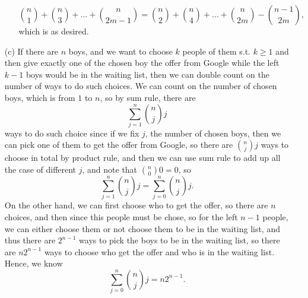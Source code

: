 \documentclass[a4paper,12pt]{article}
\begin{document}
\begin{itemize}
\begin{itemize}
		\[
			\binom{n}{1} + \binom{n}{3} + \dots + \binom{n}{2m - 1} = \binom{n}{2} + \binom{n}{4} + \dots + \binom{n}{2m} - \binom{n - 1}{2m},
		\] which is as desired.
	\end{itemize}
	\item[(c)] If there are \(n\) boys, and we want to choose \(k\) people of them s.t. \(k \ge 1\)  and then give exactly one of the chosen boy the offer from Google while the left \(k - 1\) boys would be in the waiting list, then we can double count on the number of ways to do such choices. We can count on the number of chosen boys, which is from \(1\) to \(n\), so by sum rule, there are 
	\[
		\sum_{j=1}^n \binom{n}{j}j 
	\] ways to do such choice since if we fix \(j\), the number of chosen boys, then we can pick one of them to get the offer from Google, so there are \(\binom{n}{j}j\) ways to choose in total by product rule, and then we can use sum rule to add up all the case of different \(j\), and note that \(\binom{n}{0}0 = 0\), so
	\[
		\sum_{j=1}^n \binom{n}{j} j = \sum_{j=0}^n \binom{n}{j} j. 
	\]  
	On the other hand, we can first choose who to get the offer, so there are \(n\) choices, and then since this people must be chose, so for the left \(n - 1\) people, we can either choose them or not choose them to be in the waiting list, and thus there are \(2^{n - 1}\) ways to pick the boys to be in the waiting list, so there are \(n2^{n - 1}\) ways to choose who get the offer and who is in the waiting list. Hence, we know 
	\[
		\sum_{j=0}^n \binom{n}{j}j = n 2^{n - 1}. 
	\]   
\end{itemize}



\begin{center}
\end{center}

\end{document}
